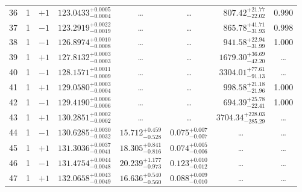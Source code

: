 \begin{table*}[!]
\begin{tabular}{llcrrlrc}
36 & 1 & $+1$ & $    123.0433_{-      0.0004}^{+      0.0005}$ & \multicolumn{1}{c}{\dots} & \multicolumn{1}{c}{\dots} & $      807.42_{-       22.02}^{+       21.77}$ & 0.990\\[1pt]
37 & 1 & $-1$ & $    123.2919_{-      0.0019}^{+      0.0022}$ & \multicolumn{1}{c}{\dots} & \multicolumn{1}{c}{\dots} & $      865.78_{-       31.93}^{+       41.71}$ & 0.998\\[1pt]
38 & 1 &$-1$  & $    126.8974_{-      0.0008}^{+      0.0010}$ & \multicolumn{1}{c}{\dots} & \multicolumn{1}{c}{\dots} & $      941.58_{-       31.99}^{+       22.94}$ & 1.000\\[1pt]

39 & 1 & $+1$ & $    127.8132_{-      0.0003}^{+      0.0003}$ & \multicolumn{1}{c}{\dots} & \multicolumn{1}{c}{\dots} & $     1679.30_{-       42.20}^{+       36.69}$ & \dots \\[1pt]
40 & 1 & $-1$ & $    128.1571_{-      0.0009}^{+      0.0011}$ & \multicolumn{1}{c}{\dots} & \multicolumn{1}{c}{\dots} & $     3304.01_{-       91.13}^{+       77.61}$ & \dots \\[1pt]
41 & 1 & $+1$ & $    129.0580_{-      0.0004}^{+      0.0003}$ & \multicolumn{1}{c}{\dots} & \multicolumn{1}{c}{\dots} & $      998.58_{-       21.96}^{+       21.18}$ & 1.000\\[1pt]
42 & 1 & $-1$  & $    129.4190_{-      0.0006}^{+      0.0006}$ & \multicolumn{1}{c}{\dots} & \multicolumn{1}{c}{\dots} & $      694.39_{-       22.41}^{+       25.78}$ & 1.000\\[1pt]
43 & 1 & $+1$ & $    130.2851_{-      0.0002}^{+      0.0002}$ & \multicolumn{1}{c}{\dots} & \multicolumn{1}{c}{\dots} & $     3704.34_{-      285.29}^{+      228.03}$ & \dots \\[1pt]
44 & 1 & $-1$ & $    130.6285_{-      0.0032}^{+      0.0030}$ & $      15.712_{-       0.528}^{+       0.459}$ & $       0.075_{-       0.007}^{+       0.007}$ & \multicolumn{1}{c}{\dots} & \dots \\[1pt]
45 & 1 & $+1$ & $    131.3036_{-      0.0041}^{+      0.0037}$ & $      18.305_{-       0.816}^{+       0.841}$ & $       0.074_{-       0.006}^{+       0.005}$ & \multicolumn{1}{c}{\dots} & \dots \\[1pt]
46 & 1 & $-1$ & $    131.4754_{-      0.0048}^{+      0.0044}$ & $      20.239_{-       0.973}^{+       1.177}$ & $       0.123_{-       0.012}^{+       0.010}$ & \multicolumn{1}{c}{\dots} & \dots \\[1pt]
47 & 1 & $+1$ & $    132.0658_{-      0.0049}^{+      0.0043}$ & $      16.636_{-       0.560}^{+       0.540}$ & $       0.088_{-       0.010}^{+       0.009}$ & \multicolumn{1}{c}{\dots} & \dots \\[1pt]

\end{tabular}
\end{table*}
